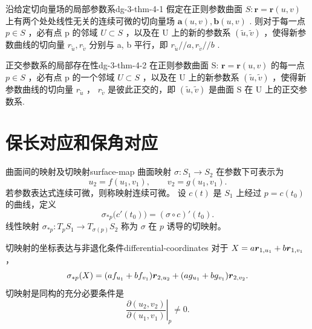\begin{theorem}{沿给定切向量场的局部参数系}{dg-3-thm-4-1}
假定在正则参数曲面  \(S: \boldsymbol{r} = \boldsymbol{r}(u, v)\)  上有两个处处线性无关的连续可微的切向量场  \(\boldsymbol{a}(u, v), \boldsymbol{b}(u, v)\) . 则对于每一点  \(p \in S\) ，必有点 p 的邻域  \(U \subset S\) ，以及在 U 上的新的参数系  \((\tilde{u}, \tilde{v})\) ，使得新参数曲线的切向量  \(r_{\tilde{u}}, r_{\tilde{v}}\)  分别与 a, b 平行，即  \(r_{\tilde{u}} // a, r_{\tilde{v}} // b\) .
\end{theorem}

\begin{theorem}{正交参数系的局部存在性}{dg-3-thm-4-2}
在正则参数曲面 S:  \(\boldsymbol{r} = \boldsymbol{r}(u, v)\)  的每一点  \(p \in S\) ，必有点 p 的一个邻域  \(U \subset S\) ，以及在 U 上的新参数系  \((\tilde{u}, \tilde{v})\) ，使得新参数曲线的切向量  \(r_{\tilde{u}}\) ， \(r_{\tilde{v}}\)  是彼此正交的，即  \((\tilde{u}, \tilde{v})\)  是曲面 S 在 U 上的正交参数系.
\end{theorem}

\section{保长对应和保角对应}

\begin{definition}{曲面间的映射及切映射}{surface-map}
曲面映射 $\sigma:S_1\to S_2$ 在参数下可表示为
\[
u_2=f(u_1,v_1),\qquad v_2=g(u_1,v_1).
\]
若参数表达式连续可微，则称映射连续可微。
设 $c(t)$ 是 $S_1$ 上经过 $p=c(t_0)$ 的曲线，定义
\[
\sigma_{*p}\bigl(c'(t_0)\bigr)=(\sigma\circ c)'(t_0).
\]
线性映射 $\sigma_{*p}:T_pS_1\to T_{\sigma(p)}S_2$ 称为 $\sigma$ 在 $p$ 诱导的切映射。
\end{definition}

\begin{proposition}{切映射的坐标表达与非退化条件}{differential-coordinates}
对于 $X=a\boldsymbol{r}_{1,u_1}+b\boldsymbol{r}_{1,v_1}$，
\[
\sigma_{*p}(X)=(af_{u_1}+bf_{v_1})\boldsymbol{r}_{2,u_2}
+(ag_{u_1}+bg_{v_1})\boldsymbol{r}_{2,v_2}.
\]
切映射是同构的充分必要条件是
\[
\left.\frac{\partial(u_2,v_2)}{\partial(u_1,v_1)}\right|_p\neq0.
\]
\end{proposition}

